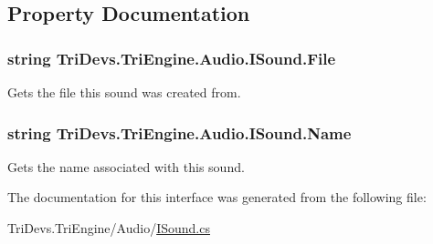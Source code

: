 \subsection{Property Documentation}
\hypertarget{interface_tri_devs_1_1_tri_engine_1_1_audio_1_1_i_sound_ad2ca796ca0364195acfc2f1d455d8d1e}{
\subsubsection[{File}]{\setlength{\rightskip}{0pt plus 5cm}string Tri\-Devs.\-Tri\-Engine.\-Audio.\-I\-Sound.\-File\hspace{0.3cm}{\ttfamily [get]}}}\label{interface_tri_devs_1_1_tri_engine_1_1_audio_1_1_i_sound_ad2ca796ca0364195acfc2f1d455d8d1e}


Gets the file this sound was created from. 

\hypertarget{interface_tri_devs_1_1_tri_engine_1_1_audio_1_1_i_sound_a92371bfd019441c3766d5e61f126de82}{
\subsubsection[{Name}]{\setlength{\rightskip}{0pt plus 5cm}string Tri\-Devs.\-Tri\-Engine.\-Audio.\-I\-Sound.\-Name\hspace{0.3cm}{\ttfamily [get]}}}\label{interface_tri_devs_1_1_tri_engine_1_1_audio_1_1_i_sound_a92371bfd019441c3766d5e61f126de82}


Gets the name associated with this sound. 



The documentation for this interface was generated from the following file\-:\begin{DoxyCompactItemize}
\item 
Tri\-Devs.\-Tri\-Engine/\-Audio/\hyperlink{_i_sound_8cs}{I\-Sound.\-cs}\end{DoxyCompactItemize}
